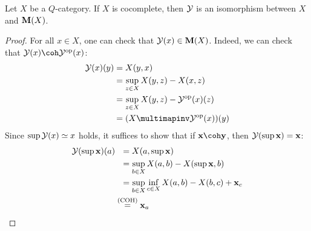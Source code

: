\begin{proposition}
Let $X$ be a $Q$-category. 
If $X$ is cocomplete, then $\mathcal{Y}$ is an isomorphism between $X$ and $\mathbf{M}(X)$. 
\end{proposition}
\begin{proof}
For all $x\in X$, one can check that $\mathcal{Y}(x)\in \mathbf{M}(X)$. Indeed, we can check that $\C Y(x) \coh \C Y^{\mathrm{op}}(x)$:
\begin{align*}
\C Y(x)(y)  &= X(y,x) \\
&=  \sup_{z\in X}X(y,z  )- X(x,z)\\
&= \sup_{z\in X}X(y,z  )- \C Y^{\mathrm{op}}(x)(z)\\
 &= (X\multimapinv \C Y^{\mathrm{op}}(x))(y)
\end{align*}
Since $\sup\mathcal{Y}(x) \simeq x$ holds, it suffices to show that if $\B x \coh \B y$, then 
$\mathcal{Y}(\sup \mathbf{x})=\mathbf{x}$: 
\begin{align*}
\C Y(\sup \B x)(a) & \ \ = X(a, \sup\B x) \\
&\ \ = \sup_{b\in X}X(a,b)-X(\sup\B x, b) \\
&\ \ = \sup_{b\in X}\inf_{c\in X}X(a,b)- X(b,c) + \B x_{c} \\
 &\stackrel{{\tiny\text{(COH)}}}{=} \B x_{a}
\end{align*}
\end{proof}


